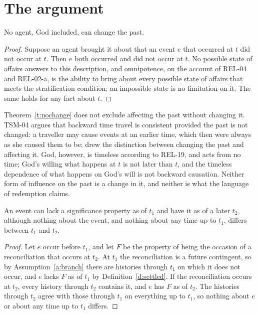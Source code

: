 \documentclass{situationist-preprint}
\begin{document}
\section{The argument}

\begin{theorem}\label{t:nochange}
No agent, God included, can change the past.
\end{theorem}

\begin{proof}
Suppose an agent brought it about that an event $e$ that occurred at $t$ did not occur at $t$. Then $e$ both occurred and did not occur at $t$. No possible state of affairs answers to this description, and omnipotence, on the account of REL-04 and REL-02-a, is the ability to bring about every possible state of affairs that meets the stratification condition; an impossible state is no limitation on it. The same holds for any fact about $t$.
\end{proof}

Theorem~\ref{t:nochange} does not exclude affecting the past without changing it. TSM-04 argues that backward time travel is consistent provided the past is not changed: a traveller may cause events at an earlier time, which then were always as she caused them to be; \citet{Lewis1976} drew the distinction between changing the past and affecting it. God, however, is timeless according to REL-19, and acts from no time; God's willing what happens at $t$ is not later than $t$, and the timeless dependence of what happens on God's will is not backward causation. Neither form of influence on the past is a change in it, and neither is what the language of redemption claims.

\begin{lemma}\label{l:gain}
An event can lack a significance property as of $t_1$ and have it as of a later $t_2$, although nothing about the event, and nothing about any time up to $t_1$, differs between $t_1$ and $t_2$.
\end{lemma}

\begin{proof}
Let $e$ occur before $t_1$, and let $F$ be the property of being the occasion of a reconciliation that occurs at $t_2$. At $t_1$ the reconciliation is a future contingent, so by Assumption~\ref{a:branch} there are histories through $t_1$ on which it does not occur, and $e$ lacks $F$ as of $t_1$ by Definition~\ref{d:settled}. If the reconciliation occurs at $t_2$, every history through $t_2$ contains it, and $e$ has $F$ as of $t_2$. The histories through $t_2$ agree with those through $t_1$ on everything up to $t_1$, so nothing about $e$ or about any time up to $t_1$ differs.
\end{proof}
\end{document}
